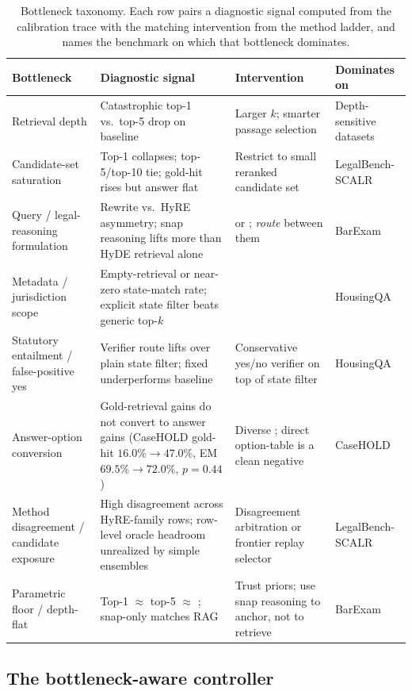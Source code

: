 \begin{table}[t]
\centering
\caption{Bottleneck taxonomy. Each row pairs a diagnostic signal computed
from the calibration trace with the matching intervention from the method
ladder, and names the benchmark on which that bottleneck dominates.}
\label{tab:bottleneck_taxonomy}
\footnotesize
\begin{tabularx}{\textwidth}{p{}YYp{0.13\textwidth}}
\toprule
Bottleneck & Diagnostic signal & Intervention & Dominates on \\
\midrule
Retrieval depth & Catastrophic top-1 vs.\ top-5 drop on baseline & Larger $k$; smarter passage selection & Depth-sensitive datasets \\
Candidate-set saturation & Top-1 collapses; top-5/top-10 tie; gold-hit rises but answer flat & Restrict to small reranked candidate set & LegalBench-SCALR \\
Query / legal-reasoning formulation & Rewrite vs.\ HyRE asymmetry; snap reasoning lifts more than HyDE retrieval alone &  or ; \emph{route} between them & BarExam \\
Metadata / jurisdiction scope & Empty-retrieval or near-zero state-match rate; explicit state filter beats generic top-$k$ &  & HousingQA \\
Statutory entailment / false-positive yes & Verifier route lifts over plain state filter; fixed \hyre{} underperforms baseline & Conservative yes/no verifier on top of state filter & HousingQA \\
Answer-option conversion & Gold-retrieval gains do not convert to answer gains (CaseHOLD gold-hit $16.0\%\!\rightarrow\!47.0\%$, EM $69.5\%\!\rightarrow\!72.0\%$, $p\!=\!0.44$) & Diverse \hyre{}; direct option-table is a clean negative & CaseHOLD \\
Method disagreement / candidate exposure & High disagreement across HyRE-family rows; row-level oracle headroom unrealized by simple ensembles & Disagreement arbitration or frontier replay selector & LegalBench-SCALR \\
Parametric floor / depth-flat & Top-1 $\approx$ top-5 $\approx$ ; snap-only matches RAG & Trust priors; use snap reasoning to anchor, not to retrieve & BarExam \\
\bottomrule
\end{tabularx}
\end{table}

\subsection{The bottleneck-aware controller}\label{sec:method:controller}


